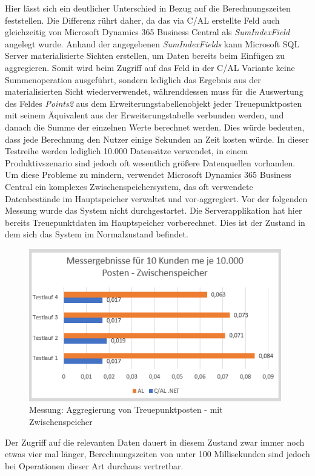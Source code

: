 Hier lässt sich ein deutlicher Unterschied in Bezug auf die Berechnungszeiten feststellen. Die Differenz rührt daher, da das via C/AL erstellte Feld auch gleichzeitig von Microsoft Dynamics 365 Business Central als \textit{SumIndexField} angelegt wurde. Anhand der angegebenen \textit{SumIndexFields} kann Microsoft SQL Server materialisierte Sichten erstellen, um Daten bereits beim Einfügen zu aggregieren. Somit wird beim Zugriff auf das Feld in der C/AL Variante keine Summenoperation ausgeführt, sondern lediglich das Ergebnis aus der materialisierten Sicht wiederverwendet, währenddessen muss für die Auswertung des Feldes \textit{Points2} aus dem Erweiterungstabellenobjekt jeder Treuepunktposten mit seinem Äquivalent aus der Erweiterungstabelle verbunden werden, und danach die Summe der einzelnen Werte berechnet werden. Dies würde bedeuten, dass jede Berechnung den Nutzer einige Sekunden an Zeit kosten würde. In dieser Testreihe werden lediglich 10.000 Datensätze verwendet, in einem Produktivszenario sind jedoch oft wesentlich größere Datenquellen vorhanden. Um diese Probleme zu mindern, verwendet Microsoft Dynamics 365 Business Central ein komplexes Zwischenspeichersystem, das oft verwendete Datenbestände im Hauptspeicher verwaltet und vor-aggregiert. 
Vor der folgenden Messung wurde das System nicht durchgestartet. Die Serverapplikation hat hier bereits Treuepunktdaten im Hauptspeicher vorberechnet. Dies ist der Zustand in dem sich das System im Normalzustand befindet.
\begin{figure}[H]
	\centering
	\includegraphics[width=110mm]{images/Test2Cache}
	\caption{Messung: Aggregierung von Treuepunktposten - mit Zwischenspeicher}
	\label{fig:Test2Schema}
\end{figure}

Der Zugriff auf die relevanten Daten dauert in diesem Zustand zwar immer noch etwas vier mal länger, Berechnungszeiten von unter 100 Millisekunden sind jedoch bei Operationen dieser Art durchaus vertretbar.

